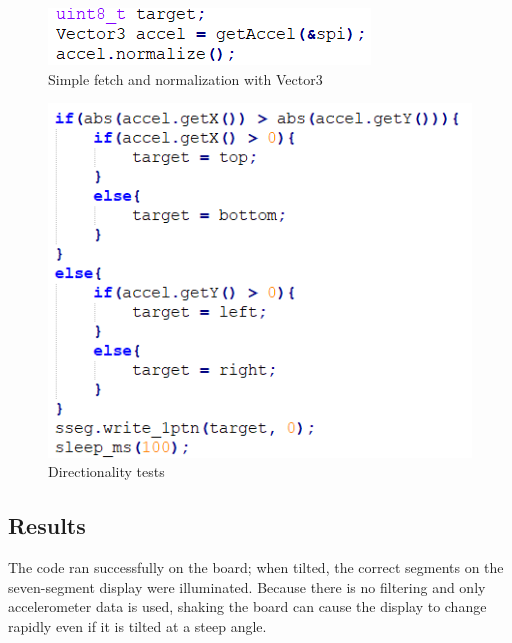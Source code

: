\documentclass{article}
\begin{document}
	
	\begin{figure}[H]
		\centering
		\includegraphics[width=.6\linewidth]{functionCall}
		\caption{Simple fetch and normalization with Vector3}
		\label{fig:call}
	\end{figure}
	
	\begin{figure}[H]
		\centering
		\includegraphics[width=.75\linewidth]{display}
		\caption{Directionality tests}
		\label{fig:disp}
	\end{figure}

	
	\subsection*{Results}
	The code ran successfully on the board; when tilted, the correct segments on the seven-segment display were illuminated. Because there is no filtering and only accelerometer data is used, shaking the board can cause the display to change rapidly even if it is tilted at a steep angle.
\end{document}
